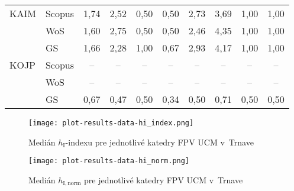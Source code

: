 \begin{table}
\begin{tabularx}{\textwidth}{XXcccc@{\hspace{3ex}}cccc}
 KAIM & Scopus & 1,74     & 2,52 & 0,50 & 0,50 & 2,73    & 3,69 & 1,00 & 1,00 \\
      & WoS    & 1,60     & 2,75 & 0,50 & 0,50 & 2,46    & 4,35 & 1,00 & 1,00 \\
      & GS     & 1,66     & 2,28 & 1,00 & 0,67 & 2,93    & 4,17 & 1,00 & 1,00 \\[3ex]
 KOJP & Scopus & --       & --   & --   & --   & --      & --   & --   & --   \\
      & WoS    & --       & --   & --   & --   & --      & --   & --   & --   \\
      & GS     & 0,67     & 0,47 & 0,50 & 0,34 & 0,50    & 0,71 & 0,50 & 0,50 \\[0.5ex]
  \bottomrule
\end{tabularx}
\end{table}

\begin{figure}
  \centering
  \texttt{[image: plot-results-data-hi\_index.png]}
  \caption{Medián $h_{\mathrm{I}}$-indexu pre jednotlivé katedry FPV UCM v~Trnave}
  \label{fig:hi-index.plot}
\end{figure}

\begin{figure}
  \centering
  \texttt{[image: plot-results-data-hi\_norm.png]}
  \caption{Medián $h_{\mathrm{I,norm}}$ pre jednotlivé katedry FPV UCM v~Trnave}
  \label{fig:hinorm.plot}
\end{figure}


